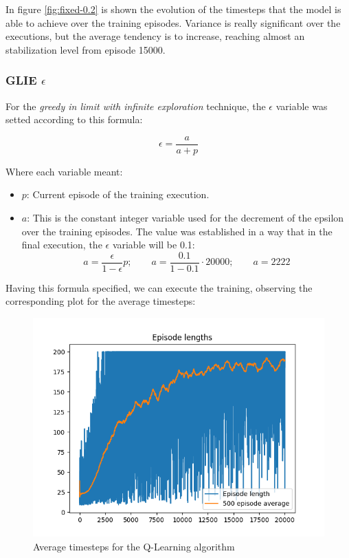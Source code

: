 \documentclass[12pt]{article}
\begin{document}
In figure \ref{fig:fixed-0.2} is shown the evolution of the timesteps that the model is able to achieve over the training episodes. Variance is really significant over the executions, but the average tendency is to increase, reaching almost an stabilization level from episode 15000.\\

\subsubsection{GLIE $\epsilon$}

For the \textit{greedy in limit with infinite exploration} technique, the $\epsilon$ variable was setted according to this formula:

\begin{equation}
    \epsilon = \frac{a}{a + p}
\end{equation}

Where each variable meant:

\begin{itemize}
    \item $p$: Current episode of the training execution.
    \item $a$: This is the constant integer variable used for the decrement of the epsilon over the training episodes. The value was established in a way that in the final execution, the $\epsilon$ variable will be 0.1:
    \begin{equation}
        a = \frac{\epsilon}{1 - \epsilon}p; \quad \quad a = \frac{0.1}{1-0.1}\cdot20000; \quad \quad a = 2222
    \end{equation}
\end{itemize}

Having this formula specified, we can execute the training, observing the corresponding plot for the average timesteps:

\begin{figure}[h]
    \centering
    \includegraphics[scale=0.6]{exercise-3/plots/episodes-variable-0.0.png}
    \caption{Average timesteps for the Q-Learning algorithm}
    \label{fig:variable}
\end{figure}
\end{document}
